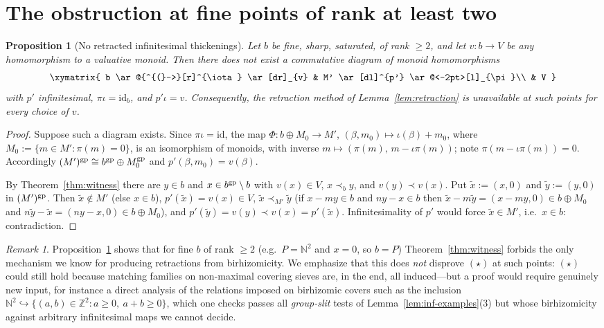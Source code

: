 \documentclass[11pt]{amsart}
\theoremstyle{plain}
\newtheorem{proposition}[theorem]{Proposition}
\theoremstyle{remark}
\newtheorem{remark}[theorem]{Remark}
\theoremstyle{definition}
\numberwithin{equation}{section}
\begin{document}
\section{The obstruction at fine points of rank at least two}

\begin{proposition}[No retracted infinitesimal thickenings]\label{prop:nothickening}
Let $b$ be fine, sharp, saturated, of rank $\ge2$, and let
$v\colon b\to V$ be any homomorphism to a valuative monoid.  Then there
does \emph{not} exist a commutative diagram of monoid homomorphisms
\[
\xymatrix{
b \ar@{^{(}->}[r]^{\iota} \ar[dr]_{v} & M' \ar[dl]^{p'} \ar@<-2pt>[l]_{\pi}\\
& V
}
\]
with $p'$ infinitesimal, $\pi\iota=\mathrm{id}_b$, and $p'\iota=v$.
Consequently, the retraction method of Lemma~\ref{lem:retraction} is
unavailable at such points for \emph{every} choice of $v$.
\end{proposition}
\begin{proof}
Suppose such a diagram exists.  Since $\pi\iota=\mathrm{id}$, the map
$\Phi\colon b\oplus M_0\to M'$, $(\beta,m_0)\mapsto\iota(\beta)+m_0$,
where $M_0:=\{m\in M':\pi(m)=0\}$, is an isomorphism of monoids, with
inverse $m\mapsto(\pi(m),\,m-\iota\pi(m))$; note
$\pi(m-\iota\pi(m))=0$.  Accordingly
$(M')^{\rm gp}\cong b^{\rm gp}\oplus M_0^{\rm gp}$ and
$p'(\beta,m_0)=v(\beta)$.

By Theorem~\ref{thm:witness} there are $y\in b$ and
$x\in b^{\rm gp}\setminus b$ with $v(x)\in V$, $x\prec_b y$, and
$v(y)\prec v(x)$.  Put $\tilde x:=(x,0)$ and $\tilde y:=(y,0)$ in
$(M')^{\rm gp}$.  Then $\tilde x\notin M'$ (else $x\in b$),
$p'(\tilde x)=v(x)\in V$, $\tilde x\prec_{M'}\tilde y$ (if $x-my\in b$
and $ny-x\in b$ then $\tilde x-m\tilde y=(x-my,0)\in b\oplus M_0$ and
$n\tilde y-\tilde x=(ny-x,0)\in b\oplus M_0$), and
$p'(\tilde y)=v(y)\prec v(x)=p'(\tilde x)$.  Infinitesimality of $p'$
would force $\tilde x\in M'$, i.e.\ $x\in b$: contradiction.
\end{proof}

\begin{remark}
Proposition~\ref{prop:nothickening} shows that for fine $b$ of rank
$\ge2$ (e.g.\ $P=\mathbb N^2$ and $x=0$, so $b=P$) Theorem~\ref{thm:witness}
forbids the only mechanism we know for producing retractions from
birhizomicity.  We emphasize that this does \emph{not} disprove $(\star)$
at such points: $(\star)$ could still hold because matching families on
non-maximal covering sieves are, in the end, all induced---but a proof
would require genuinely new input, for instance a direct analysis of the
relations imposed on birhizomic covers such as the inclusion
$\mathbb N^2\hookrightarrow\{(a,b)\in\mathbb Z^2: a\ge0,\ a+b\ge0\}$,
which one checks passes all \emph{group-slit} tests of
Lemma~\ref{lem:inf-examples}(3) but whose birhizomicity against arbitrary
infinitesimal maps we cannot decide.
\end{remark}
\end{document}
